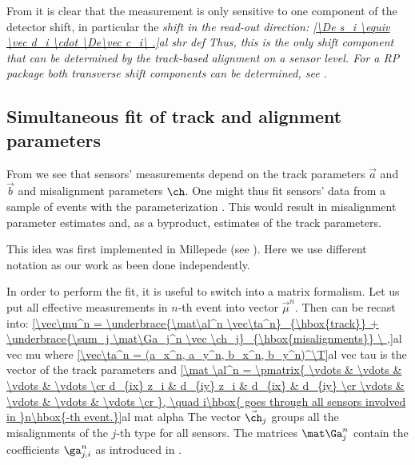 
From  it is clear that the measurement is only sensitive to one component of the detector shift, in particular the \em{shift in the read-out direction}:
\eqref{\De s_i \equiv \vec d_i \cdot \De\vec c_i\ .}{al shr def}
Thus, this is the only shift component that can be determined by the track-based alignment on a sensor level. For a RP package both transverse shift components can be determined, see .


\subsection[al sim fit]{Simultaneous fit of track and alignment parameters}

From  we see that sensors' measurements depend on the track parameters $\vec a$ and $\vec b$ and misalignment parameters $\ch$. One might thus fit sensors' data from a sample of events with the parameterization . This would result in misalignment parameter estimates and, as a byproduct, estimates of the track parameters.

This idea was first implemented in Millepede (see ). Here we use different notation as our work as been done independently.

In order to perform the fit, it is useful to switch into a matrix formalism. Let us put all effective measurements in $n$-th event into vector $\vec\mu^n$. Then  can be recast into:
\eqref{\vec\mu^n =
	\underbrace{\mat\al^n \vec\ta^n}_{\hbox{track}}
	+
	\underbrace{\sum_j \mat\Ga_j^n \vec \ch_j}_{\hbox{misalignments}}
\ ,}{al vec mu}
where
\eqref{\vec\ta^n = (a_x^n, a_y^n, b_x^n, b_y^n)^\T}{al vec tau}
is the vector of the track parameters and 
\eqref{\mat \al^n = \pmatrix{
\vdots & \vdots & \vdots & \vdots \cr
d_{ix} z_i & d_{iy} z_i & d_{ix} & d_{iy} \cr
\vdots & \vdots & \vdots & \vdots \cr
}, \quad i\hbox{ goes through all sensors involved in }n\hbox{-th event.}}{al mat alpha}
The vector $\vec\ch_j$ groups all the misalignments of the $j$-th type for all sensors. The matrices $\mat\Ga_j^n$ contain the coefficients $\ga^n_{j,i}$ as introduced in .

